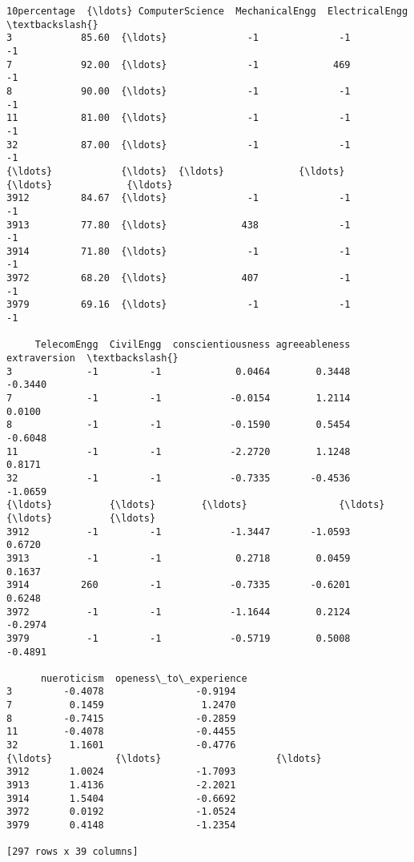 \documentclass[11pt]{article}
\begin{document}
\begin{tcolorbox}[breakable, size=fbox, boxrule=.5pt, pad at break*=1mm, opacityfill=0]
\begin{Verbatim}[commandchars=\\\{\}]
      10percentage  {\ldots} ComputerScience  MechanicalEngg  ElectricalEngg  \textbackslash{}
3            85.60  {\ldots}              -1              -1              -1
7            92.00  {\ldots}              -1             469              -1
8            90.00  {\ldots}              -1              -1              -1
11           81.00  {\ldots}              -1              -1              -1
32           87.00  {\ldots}              -1              -1              -1
{\ldots}            {\ldots}  {\ldots}             {\ldots}             {\ldots}             {\ldots}
3912         84.67  {\ldots}              -1              -1              -1
3913         77.80  {\ldots}             438              -1              -1
3914         71.80  {\ldots}              -1              -1              -1
3972         68.20  {\ldots}             407              -1              -1
3979         69.16  {\ldots}              -1              -1              -1

     TelecomEngg  CivilEngg  conscientiousness agreeableness extraversion  \textbackslash{}
3             -1         -1             0.0464        0.3448      -0.3440
7             -1         -1            -0.0154        1.2114       0.0100
8             -1         -1            -0.1590        0.5454      -0.6048
11            -1         -1            -2.2720        1.1248       0.8171
32            -1         -1            -0.7335       -0.4536      -1.0659
{\ldots}          {\ldots}        {\ldots}                {\ldots}           {\ldots}          {\ldots}
3912          -1         -1            -1.3447       -1.0593       0.6720
3913          -1         -1             0.2718        0.0459       0.1637
3914         260         -1            -0.7335       -0.6201       0.6248
3972          -1         -1            -1.1644        0.2124      -0.2974
3979          -1         -1            -0.5719        0.5008      -0.4891

      nueroticism  openess\_to\_experience
3         -0.4078                -0.9194
7          0.1459                 1.2470
8         -0.7415                -0.2859
11        -0.4078                -0.4455
32         1.1601                -0.4776
{\ldots}           {\ldots}                    {\ldots}
3912       1.0024                -1.7093
3913       1.4136                -2.2021
3914       1.5404                -0.6692
3972       0.0192                -1.0524
3979       0.4148                -1.2354

[297 rows x 39 columns]
\end{Verbatim}
\end{tcolorbox}
        
\end{document}
